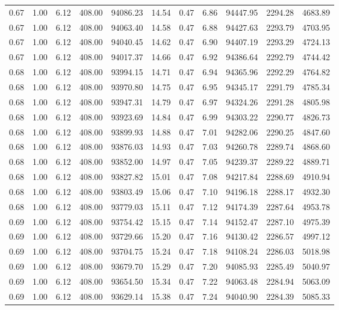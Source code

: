 \begin{table}[!ht]
\begin{tabular}{rrrrrrrrrrr}
0.67 & 1.00 & 6.12 & 408.00 & 94086.23 & 14.54 & 0.47 & 6.86 & 94447.95 & 2294.28 & 4683.89 \\
0.67 & 1.00 & 6.12 & 408.00 & 94063.40 & 14.58 & 0.47 & 6.88 & 94427.63 & 2293.79 & 4703.95 \\
0.67 & 1.00 & 6.12 & 408.00 & 94040.45 & 14.62 & 0.47 & 6.90 & 94407.19 & 2293.29 & 4724.13 \\
0.67 & 1.00 & 6.12 & 408.00 & 94017.37 & 14.66 & 0.47 & 6.92 & 94386.64 & 2292.79 & 4744.42 \\
0.68 & 1.00 & 6.12 & 408.00 & 93994.15 & 14.71 & 0.47 & 6.94 & 94365.96 & 2292.29 & 4764.82 \\
0.68 & 1.00 & 6.12 & 408.00 & 93970.80 & 14.75 & 0.47 & 6.95 & 94345.17 & 2291.79 & 4785.34 \\
0.68 & 1.00 & 6.12 & 408.00 & 93947.31 & 14.79 & 0.47 & 6.97 & 94324.26 & 2291.28 & 4805.98 \\
0.68 & 1.00 & 6.12 & 408.00 & 93923.69 & 14.84 & 0.47 & 6.99 & 94303.22 & 2290.77 & 4826.73 \\
0.68 & 1.00 & 6.12 & 408.00 & 93899.93 & 14.88 & 0.47 & 7.01 & 94282.06 & 2290.25 & 4847.60 \\
0.68 & 1.00 & 6.12 & 408.00 & 93876.03 & 14.93 & 0.47 & 7.03 & 94260.78 & 2289.74 & 4868.60 \\
0.68 & 1.00 & 6.12 & 408.00 & 93852.00 & 14.97 & 0.47 & 7.05 & 94239.37 & 2289.22 & 4889.71 \\
0.68 & 1.00 & 6.12 & 408.00 & 93827.82 & 15.01 & 0.47 & 7.08 & 94217.84 & 2288.69 & 4910.94 \\
0.68 & 1.00 & 6.12 & 408.00 & 93803.49 & 15.06 & 0.47 & 7.10 & 94196.18 & 2288.17 & 4932.30 \\
0.68 & 1.00 & 6.12 & 408.00 & 93779.03 & 15.11 & 0.47 & 7.12 & 94174.39 & 2287.64 & 4953.78 \\
0.69 & 1.00 & 6.12 & 408.00 & 93754.42 & 15.15 & 0.47 & 7.14 & 94152.47 & 2287.10 & 4975.39 \\
0.69 & 1.00 & 6.12 & 408.00 & 93729.66 & 15.20 & 0.47 & 7.16 & 94130.42 & 2286.57 & 4997.12 \\
0.69 & 1.00 & 6.12 & 408.00 & 93704.75 & 15.24 & 0.47 & 7.18 & 94108.24 & 2286.03 & 5018.98 \\
0.69 & 1.00 & 6.12 & 408.00 & 93679.70 & 15.29 & 0.47 & 7.20 & 94085.93 & 2285.49 & 5040.97 \\
0.69 & 1.00 & 6.12 & 408.00 & 93654.50 & 15.34 & 0.47 & 7.22 & 94063.48 & 2284.94 & 5063.09 \\
0.69 & 1.00 & 6.12 & 408.00 & 93629.14 & 15.38 & 0.47 & 7.24 & 94040.90 & 2284.39 & 5085.33 \\

\end{tabular}
\end{table}
